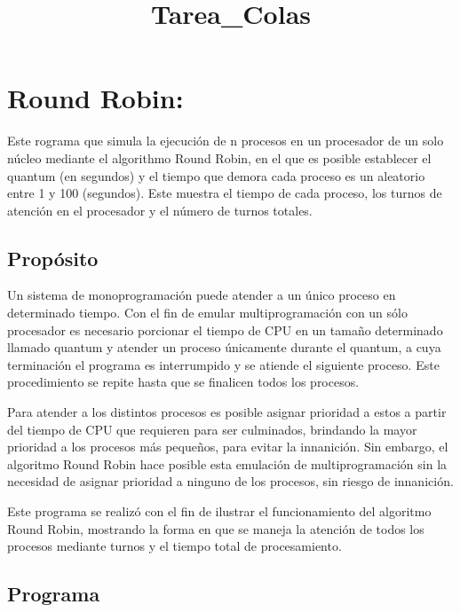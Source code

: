 \documentclass[11pt]{article}
\title{Tarea\_Colas}
\begin{document}
    
    
    \maketitle
    
    

    
    \section{Round Robin:}\label{round-robin}

Este rograma que simula la ejecución de n procesos en un procesador de
un solo núcleo mediante el algorithmo Round Robin, en el que es posible
establecer el quantum (en segundos) y el tiempo que demora cada proceso
es un aleatorio entre 1 y 100 (segundos). Este muestra el tiempo de cada
proceso, los turnos de atención en el procesador y el número de turnos
totales.

    \subsection{Propósito}\label{propuxf3sito}

Un sistema de monoprogramación puede atender a un único proceso en
determinado tiempo. Con el fin de emular multiprogramación con un sólo
procesador es necesario porcionar el tiempo de CPU en un tamaño
determinado llamado quantum y atender un proceso únicamente durante el
quantum, a cuya terminación el programa es interrumpido y se atiende el
siguiente proceso. Este procedimiento se repite hasta que se finalicen
todos los procesos.

Para atender a los distintos procesos es posible asignar prioridad a
estos a partir del tiempo de CPU que requieren para ser culminados,
brindando la mayor prioridad a los procesos más pequeños, para evitar la
innanición. Sin embargo, el algoritmo Round Robin hace posible esta
emulación de multiprogramación sin la necesidad de asignar prioridad a
ninguno de los procesos, sin riesgo de innanición.

Este programa se realizó con el fin de ilustrar el funcionamiento del
algoritmo Round Robin, mostrando la forma en que se maneja la atención
de todos los procesos mediante turnos y el tiempo total de
procesamiento.

    \subsection{Programa}\label{programa}
\end{document}
